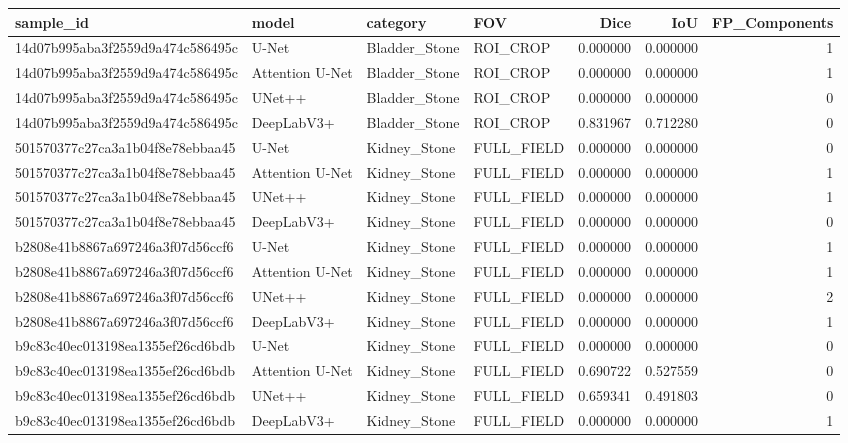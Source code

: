 \begin{tabular}{llllrrr}
\toprule
sample_id & model & category & FOV & Dice & IoU & FP_Components \\
\midrule
14d07b995aba3f2559d9a474c586495c & U-Net & Bladder_Stone & ROI_CROP & 0.000000 & 0.000000 & 1 \\
14d07b995aba3f2559d9a474c586495c & Attention U-Net & Bladder_Stone & ROI_CROP & 0.000000 & 0.000000 & 1 \\
14d07b995aba3f2559d9a474c586495c & UNet++ & Bladder_Stone & ROI_CROP & 0.000000 & 0.000000 & 0 \\
14d07b995aba3f2559d9a474c586495c & DeepLabV3+ & Bladder_Stone & ROI_CROP & 0.831967 & 0.712280 & 0 \\
501570377c27ca3a1b04f8e78ebbaa45 & U-Net & Kidney_Stone & FULL_FIELD & 0.000000 & 0.000000 & 0 \\
501570377c27ca3a1b04f8e78ebbaa45 & Attention U-Net & Kidney_Stone & FULL_FIELD & 0.000000 & 0.000000 & 1 \\
501570377c27ca3a1b04f8e78ebbaa45 & UNet++ & Kidney_Stone & FULL_FIELD & 0.000000 & 0.000000 & 1 \\
501570377c27ca3a1b04f8e78ebbaa45 & DeepLabV3+ & Kidney_Stone & FULL_FIELD & 0.000000 & 0.000000 & 0 \\
b2808e41b8867a697246a3f07d56ccf6 & U-Net & Kidney_Stone & FULL_FIELD & 0.000000 & 0.000000 & 1 \\
b2808e41b8867a697246a3f07d56ccf6 & Attention U-Net & Kidney_Stone & FULL_FIELD & 0.000000 & 0.000000 & 1 \\
b2808e41b8867a697246a3f07d56ccf6 & UNet++ & Kidney_Stone & FULL_FIELD & 0.000000 & 0.000000 & 2 \\
b2808e41b8867a697246a3f07d56ccf6 & DeepLabV3+ & Kidney_Stone & FULL_FIELD & 0.000000 & 0.000000 & 1 \\
b9c83c40ec013198ea1355ef26cd6bdb & U-Net & Kidney_Stone & FULL_FIELD & 0.000000 & 0.000000 & 0 \\
b9c83c40ec013198ea1355ef26cd6bdb & Attention U-Net & Kidney_Stone & FULL_FIELD & 0.690722 & 0.527559 & 0 \\
b9c83c40ec013198ea1355ef26cd6bdb & UNet++ & Kidney_Stone & FULL_FIELD & 0.659341 & 0.491803 & 0 \\
b9c83c40ec013198ea1355ef26cd6bdb & DeepLabV3+ & Kidney_Stone & FULL_FIELD & 0.000000 & 0.000000 & 1 \\
\bottomrule
\end{tabular}
